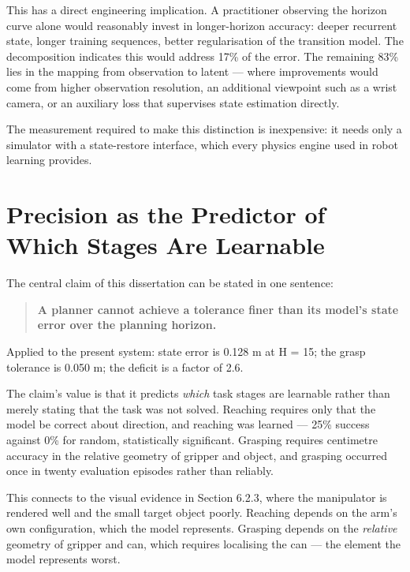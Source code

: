 \documentclass[12pt,a4paper,oneside]{report}
\begin{document}
This has a direct engineering implication. A practitioner observing the horizon
curve alone would reasonably invest in longer-horizon accuracy: deeper recurrent
state, longer training sequences, better regularisation of the transition model.
The decomposition indicates this would address 17\% of the error. The remaining
83\% lies in the mapping from observation to latent --- where improvements would
come from higher observation resolution, an additional viewpoint such as a wrist
camera, or an auxiliary loss that supervises state estimation directly.

The measurement required to make this distinction is inexpensive: it needs only
a simulator with a state-restore interface, which every physics engine used in
robot learning provides.

\hypertarget{precision-as-the-predictor-of-which-stages-are-learnable}{%
\section{Precision as the Predictor of Which Stages Are Learnable}\label{precision-as-the-predictor-of-which-stages-are-learnable}}

The central claim of this dissertation can be stated in one sentence:

\begin{quote}
\textbf{A planner cannot achieve a tolerance finer than its model's state error over
the planning horizon.}
\end{quote}

Applied to the present system: state error is 0.128 m at H = 15; the grasp
tolerance is 0.050 m; the deficit is a factor of 2.6.

The claim's value is that it predicts \emph{which} task stages are learnable rather
than merely stating that the task was not solved. Reaching requires only that
the model be correct about direction, and reaching was learned --- 25\% success
against 0\% for random, statistically significant. Grasping requires centimetre
accuracy in the relative geometry of gripper and object, and grasping occurred
once in twenty evaluation episodes rather than reliably.

This connects to the visual evidence in Section 6.2.3, where the manipulator is
rendered well and the small target object poorly. Reaching depends on the arm's
own configuration, which the model represents. Grasping depends on the
\emph{relative} geometry of gripper and can, which requires localising the can --- the
element the model represents worst.
\end{document}
